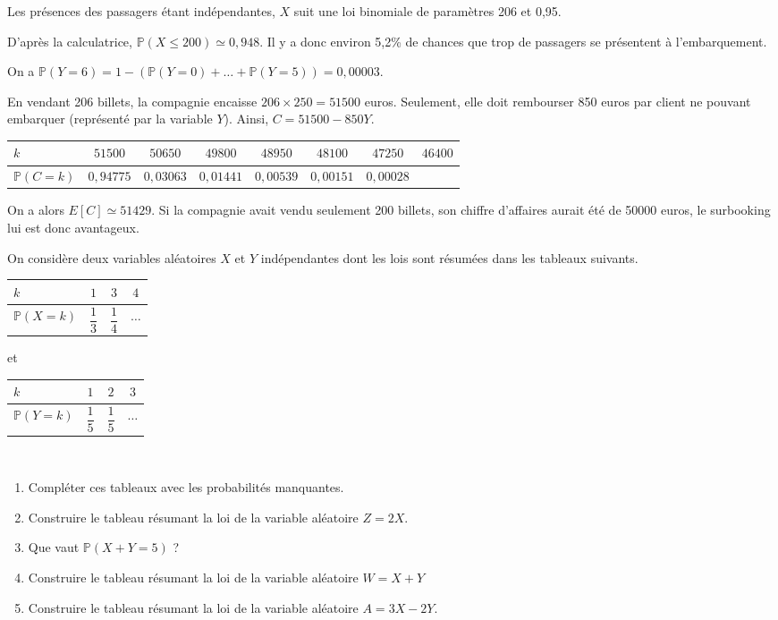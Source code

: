 \documentclass[11pt,fleqn, openany]{book} %
\begin{document}
\begin{solution}Les présences des passagers étant indépendantes, $X$ suit une loi binomiale de paramètres 206 et 0,95. 

D'après la calculatrice, $\mathbb{P}(X \leqslant 200) \simeq 0,948$. Il y a donc environ 5,2\% de chances que trop de passagers se présentent à l'embarquement.

On a $\mathbb{P}(Y=6)=1-(\mathbb{P}(Y=0)+\dots + \mathbb{P}(Y=5))=0,00003$.

En vendant 206 billets, la compagnie encaisse $206 \times 250 = 51500$ euros. Seulement, elle doit rembourser 850 euros par client ne pouvant embarquer (représenté par la variable $Y$). Ainsi, $C=51500-850Y$.

\begin{center}
\begin{tabular}{|l|c|c|c|c|c|c|c|}
\hline
$k$ & $51500$& $50650$ & $49800$ & $48950$ & $48100$ & $47250$ & $46400$ \\
\hline
$\mathbb{P}(C=k)$ & $0,94775$ & $0,03063$ & $0,01441$   & $0,00539$ & $0,00151$ & $0,00028$ & \\
\hline \end{tabular}
\end{center}

On a alors $E[C]\simeq 51429$. Si la compagnie avait vendu seulement 200 billets, son chiffre d'affaires aurait été de 50000 euros, le surbooking lui est donc avantageux.\end{solution}





\begin{exercise}[topic=lgn01]On considère deux variables aléatoires $X$ et $Y$ indépendantes dont les lois sont résumées dans les tableaux suivants.
\vskip10pt
\renewcommand{\arraystretch}{2.2}
\hfill
\begin{tabular}{|l|c|c|c|}
\hline
$k$ & $1$& $3$ & $4$  \\
\hline
$\mathbb{P}(X=k)$ & $\dfrac{1}{3}$ & $\dfrac{1}{4}$ & $\ldots$ \\
\hline \end{tabular}\hfill
et
\hfill
\begin{tabular}{|l|c|c|c|}
\hline
$k$ & $1$& $2$ & $3$ \\
\hline
$\mathbb{P}(Y=k)$ & $\dfrac{1}{5}$ & $\dfrac{1}{5}$ & $\ldots$ \\
\hline \end{tabular}\hfill~
\vskip10pt
\begin{enumerate}
\item Compléter ces tableaux avec les probabilités manquantes.
\item Construire le tableau résumant la loi de la variable aléatoire $Z=2X$.
\item Que vaut $\mathbb{P}(X+Y=5)$ ?
\item Construire le tableau résumant la loi de la variable aléatoire $W=X+Y$
\item Construire le tableau résumant la loi de la variable aléatoire $A=3X-2Y$.
\end{enumerate}\end{exercise}
\end{document}
